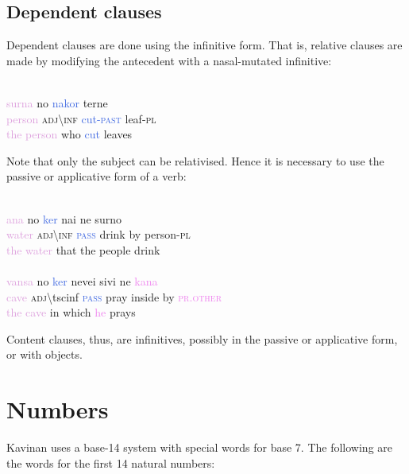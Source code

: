 \documentclass{book}
\newcommand{\bs}{\textbackslash}
\newcommand{\tsc}{\textsc}
\newcommand{\hli}[1]{\textcolor{Plum}{#1}}
\newcommand{\hlii}[1]{\textcolor{UruwiGreen}{#1}}
\newcommand{\hliii}[1]{\textcolor{RoyalBlue}{#1}}
\newcommand{\hliv}[1]{\textcolor{RubineRed}{#1}}
\newcommand{\hlv}[1]{\textcolor{Bittersweet}{#1}}
\newcommand{\hlvi}[1]{\textcolor{PineGreen}{#1}}
\newcommand{\hlvii}[1]{\textcolor{Violet}{#1}}
\begin{document}
\section{Dependent clauses}

Dependent clauses are done using the infinitive form. That is, relative clauses are made by modifying the antecedent with a nasal-mutated infinitive:

~ \\
\hli{surna} \hlii{no} \hliii{nakor} \hliv{terne} \\
\hli{person} \hlii{\tsc{adj}\bs{\tsc{inf}}} \hliii{cut-\tsc{past}} \hliv{leaf-\tsc{pl}} \\
\hli{the person} \hlii{who} \hliii{cut} \hliv{leaves}

Note that only the subject can be relativised. Hence it is necessary to use the passive or applicative form of a verb:

~ \\
\hli{ana} \hlii{no} \hliii{ker} \hliv{nai} \hlv{ne} \hlvi{surno} \\
\hli{water} \hlii{\tsc{adj}\bs{\tsc{inf}}} \hliii{\tsc{pass}} \hliv{drink} \hlv{by} \hlvi{person-\tsc{pl}} \\
\hli{the water} \hlii{that} \hlvi{the people} \hliv{drink} \\
~ \\
\hli{vansa} \hlii{no} \hliii{ker} \hliv{nevei} \hlv{sivi} \hlvi{ne} \hlvii{kana} \\
\hli{cave} \hlii{\tsc{adj}\bs{tsc{inf}}} \hliii{\tsc{pass}} \hliv{pray} \hlv{inside} \hlvi{by} \hlvii{\tsc{pr}.\tsc{other}} \\
\hli{the cave} \hlv{in} \hlii{which} \hlvii{he} \hliv{prays}

Content clauses, thus, are infinitives, possibly in the passive or applicative form, or with objects.

\chapter{Numbers}

Kavinan uses a base-14 system with special words for base 7. The following are the words for the first 14 natural numbers:
\end{document}
